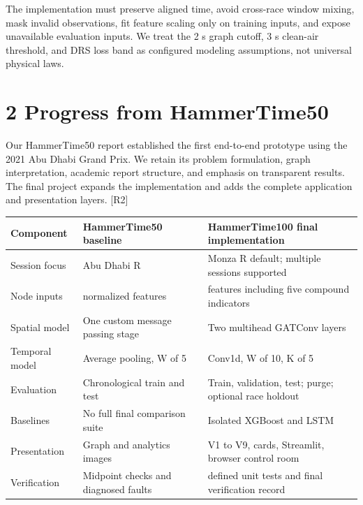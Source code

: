 \documentclass[11pt,a4paper,oneside]{report}
\begin{document}
The implementation must preserve aligned time, avoid cross-race window mixing, mask invalid observations, fit feature scaling only on training inputs, and expose unavailable evaluation inputs. We treat the 2 s graph cutoff, 3 s clean-air threshold, and DRS loss band as configured modeling assumptions, not universal physical laws.

\clearpage

\clearpage\chapter*{2 Progress from HammerTime50}

Our HammerTime50 report established the first end-to-end prototype using the 2021 Abu Dhabi Grand Prix. We retain its problem formulation, graph interpretation, academic report structure, and emphasis on transparent results. The final project expands the implementation and adds the complete application and presentation layers. [R2]

\begin{center}\small\begin{tabularx}{\textwidth}{@{}>{\raggedright\arraybackslash}X>{\raggedright\arraybackslash}X>{\raggedright\arraybackslash}X@{}}

\toprule

Component & HammerTime50 baseline & HammerTime100 final implementation \\

\midrule

Session focus & 2021 Abu Dhabi R & 2023 Monza R default; multiple sessions supported \\

Node inputs & 4 normalized features & 9 features including five compound indicators \\

Spatial model & One custom message passing stage & Two multihead GATConv layers \\

Temporal model & Average pooling, W of 5 & Conv1d, W of 10, K of 5 \\

Evaluation & Chronological train and test & Train, validation, test; purge; optional race holdout \\

Baselines & No full final comparison suite & Isolated XGBoost and LSTM \\

Presentation & Graph and analytics images & V1 to V9, cards, Streamlit, browser control room \\

Verification & Midpoint checks and diagnosed faults & 26 defined unit tests and final verification record \\

\bottomrule\end{tabularx}\end{center}
\end{document}
